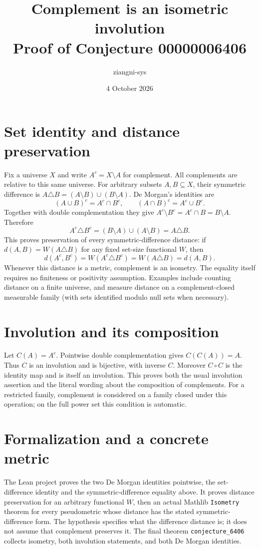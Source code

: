 \documentclass[10pt]{article}
\title{Complement is an isometric involution\\Proof of Conjecture 00000006406}
\author{ziangni-sys}
\date{4 October 2026}
\begin{document}
\maketitle
\section*{Set identity and distance preservation}
Fix a universe $X$ and write $A^c=X\setminus A$ for complement.
All complements are relative to this same universe.
For arbitrary subsets $A,B\subseteq X$, their symmetric difference is
$A\triangle B=(A\setminus B)\cup(B\setminus A)$.
De Morgan's identities are
\[
(A\cup B)^c=A^c\cap B^c,\qquad
(A\cap B)^c=A^c\cup B^c.
\]
Together with double complementation they give
$A^c\setminus B^c=A^c\cap B=B\setminus A$. Therefore
\[
A^c\triangle B^c=(B\setminus A)\cup(A\setminus B)
=A\triangle B.
\]
This proves preservation of every symmetric-difference distance:
if $d(A,B)=W(A\triangle B)$ for any fixed set-size functional $W$, then
\[
d(A^c,B^c)=W(A^c\triangle B^c)
=W(A\triangle B)=d(A,B).
\]
Whenever this distance is a metric, complement is an isometry.
The equality itself requires no finiteness or positivity assumption.
Examples include counting distance on a finite universe, and
measure distance on a complement-closed measurable family
(with sets identified modulo null sets when necessary).

\section*{Involution and its composition}
Let $C(A)=A^c$. Pointwise double complementation gives
$C(C(A))=A$. Thus $C$ is an involution and is bijective, with inverse $C$.
Moreover $C\circ C$ is the identity map and is itself an involution.
This proves both the usual involution assertion and the literal wording
about the composition of complements.
For a restricted family, complement is considered on a family closed
under this operation; on the full power set this condition is automatic.

\section*{Formalization and a concrete metric}
The Lean project proves the two De Morgan identities pointwise, the
set-difference identity and the symmetric-difference equality above.
It proves distance preservation for an arbitrary functional $W$, then
an actual Mathlib \texttt{Isometry} theorem for every pseudometric whose
distance has the stated symmetric-difference form.
The hypothesis specifies what the difference distance is; it does not
assume that complement preserves it.
The final theorem \texttt{conjecture\_6406} collects isometry, both
involution statements, and both De Morgan identities.
\end{document}
